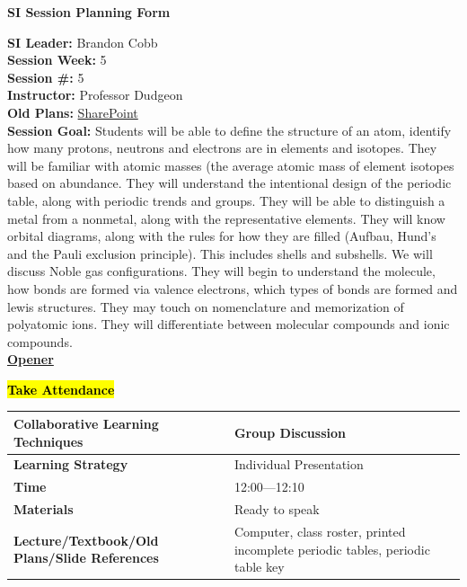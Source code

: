 \documentclass{article}
\begin{document}
\usetikzlibrary{positioning, shapes.geometric, arrows.meta, decorations.pathreplacing, fit, backgrounds}
\begin{center}
    {\LARGE \textbf{SI Session Planning Form}}
\end{center}

\vspace{0.5cm}

\noindent
\begin{flushleft}
\textbf{SI Leader:} Brandon Cobb \\
\textbf{Session Week:} 5 \\
\textbf{Session \#:} 5 \\
\textbf{Instructor:} Professor Dudgeon \\
\textbf{Old Plans:} \href{https://macombedu.sharepoint.com/:b:/s/ASC-SupplementalInstructionEmbeddedTutoring/IQBvRyfNvxGGQYObfgZOKn8UARbteAbUZFaLhS7nR4OoDmQ?e=Ic6HHf}{SharePoint} \\
\textbf{Session Goal:} Students will be able to define the structure of an atom, identify how many protons, neutrons and electrons are in elements and isotopes. They will be familiar with atomic masses (the average atomic mass of element isotopes based on abundance. They will understand the intentional design of the periodic table, along with periodic trends and groups. They will be able to distinguish a metal from a nonmetal, along with the representative elements. They will know orbital diagrams, along with the rules for how they are filled (Aufbau, Hund's and the Pauli exclusion principle). This includes shells and subshells. We will discuss Noble gas configurations. They will begin to understand the molecule, how bonds are formed via valence electrons, which types of bonds are formed and lewis structures. They may touch on nomenclature and memorization of polyatomic ions. They will differentiate between molecular compounds and ionic compounds. \\ 

\vspace{1em}
\textbf{\underline{Opener}}
{\centering\large\textbf{\hl{Take Attendance}}\par}\vspace{-0.25\baselineskip}


\begin{tabular}{|p{4.2cm}|p{9.8cm}|}
\hline
\textbf{Collaborative Learning Techniques} & Group Discussion \\
\hline
\textbf{Learning Strategy} & Individual Presentation \\
\hline
\textbf{Time} & 12:00---12:10 \\
\hline
\textbf{Materials} & Ready to speak \\
\hline
\textbf{Lecture/Textbook/Old Plans/Slide References} & Computer, class roster, printed incomplete periodic tables, periodic table key \\
\hline
\end{tabular}


\end{flushleft}
\end{document}

